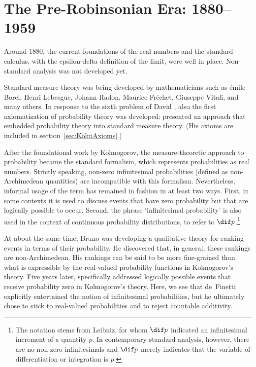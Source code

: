 \section{The Pre-Robinsonian Era: 1880--1959}\label{sec:preR}
Around 1880, the current foundations of the real numbers and the standard calculus, with the epsilon-delta definition of the limit, were well in place. Non-standard analysis was not developed yet.

Standard measure theory was being developed by mathematicians such as {\'{e}}mile Borel, Henri Lebesgue, Johann Radon, Maurice Fr\'{e}chet, Giuseppe Vitali, and many others. In response to the sixth problem of David \citet{Hilbert:1900}, also the first axiomatization of probability theory was developed: \citet{Kolmogorov:1933} presented an approach that embedded probability theory into standard measure theory. (His axioms are included in section~\ref{sec:KolmAxioms}.)

After the foundational work by Kolmogorov, the measure-theoretic approach to probability became the standard formalism, which represents probabilities as real numbers. Strictly speaking, non-zero infinitesimal probabilities (defined as non-Archimedean quantities) are incompatible with this formalism. Nevertheless, informal usage of the term has remained in fashion in at least two ways. First, in some contexts it is used to discuss events that have zero probability but that are logically possible to occur. Second, the phrase `infinitesimal probability' is also used in the context of continuous probability distributions, to refer to $\dif p$.\footnote{The notation stems from Leibniz, for whom $\dif p$ indicated an infinitesimal increment of a quantity $p$. In contemporary standard analysis, however, there are no non-zero infinitesimals and $\dif p$ merely indicates that the variable of differentiation or integration is $p$.}

At about the same time, Bruno \citet{deFinetti:1931} was developing a qualitative theory for ranking events in terms of their probability. He discovered that, in general, these rankings are non-Archimedean. His rankings can be said to be more fine-grained than what is expressible by the real-valued probability functions in Kolmogorov's theory. Five years later, \citet{deFinetti:1936} specifically addressed logically possible events that receive probability zero in Kolmogorov's theory. Here, we see that de~Finetti explicitly entertained the notion of infinitesimal probabilities, but he ultimately chose to stick to real-valued probabilities and to reject countable additivity.


